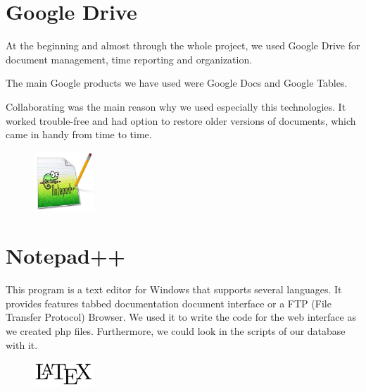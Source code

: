 \section{Google Drive}
At the beginning and almost through the whole project, we used Google Drive for document management, time reporting and organization.

The main Google products we have used were Google Docs and Google Tables.

Collaborating was the main reason why we used especially this technologies. It worked trouble-free and had option to restore older versions of documents, which came in handy from time to time.

\begin{figure}
  \begin{center}
    \includegraphics[width=0.2\textwidth] {bilder/Notepad}
  \end{center}
\end{figure}
\section{Notepad++}
This program is a text editor for Windows that supports several languages. It provides features tabbed documentation document interface or a FTP (File Transfer Protocol) Browser. We used it to write the code for the web interface as we created \gls{php} files. Furthermore, we could look in the scripts of our database with it.

\begin{figure}
  \begin{center}
    \includegraphics[width=0.2\textwidth] {bilder/LaTeX}
  \end{center}
\end{figure}
